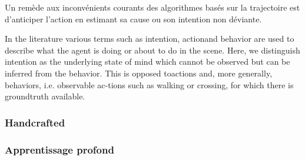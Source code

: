 Un remède aux inconvénients courants des algorithmes basés sur la trajectoire est d'anticiper l'action en estimant sa cause ou son intention non déviante.


In the literature various terms such as intention, actionand behavior are used to describe what the agent is doing or about to do in the scene. Here, we distinguish intention as the underlying state of mind which cannot be observed but can be inferred from the behavior. This is opposed toactions and, more generally, behaviors, i.e. observable ac-tions such as walking or crossing, for which there is groundtruth available.




\subsubsection{Handcrafted}
\subsubsection{Apprentissage profond}


